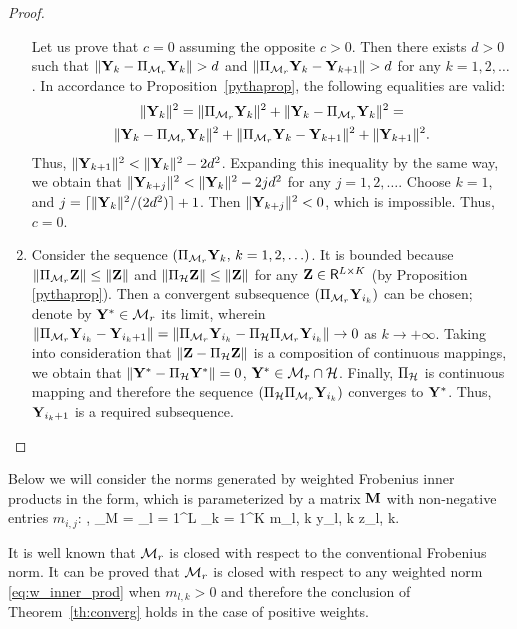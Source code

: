 \documentclass[sii]{ipart}
\begin{document}
\begin{proof}
\begin{enumerate}
		Let us prove that $c = 0$ assuming the opposite $c > 0$. Then there exists $d > 0$ such that $\|\mathbf{Y}_k - \Pi_{\mathcal{M}_r} \mathbf{Y}_k\| > d$ and $\|\Pi_{\mathcal{M}_r} \mathbf{Y}_k - \mathbf{Y}_{k + 1}\| > d$ for any $k = 1, 2, \ldots$. In accordance to Proposition~\ref{pythaprop}, the following equalities are valid:
		\begin{multline*}
		\|\bfY_k\|^2 = \|\Pi_{\calM_r} \bfY_k\|^2 + \|\bfY_k - \Pi_{\calM_r} \bfY_k\|^2 =\\ \|\bfY_k - \Pi_{\calM_r} \bfY_k\|^2 + \|\Pi_{\calM_r} \bfY_k - \bfY_{k + 1}\|^2 + \|\bfY_{k + 1}\|^2.
		\end{multline*}
		Thus, $\|\mathbf{Y}_{k+1}\|^2 < \|\mathbf{Y}_k\|^2 - 2d^2$. Expanding this inequality by the same way, we obtain that $\|\mathbf{Y}_{k+j}\|^2 < \|\mathbf{Y}_k\|^2 - 2 j d^2$ for any $j = 1, 2, \ldots$. Choose $k = 1$, and $j = \lceil \|\mathbf{Y}_k\|^2 / (2d^2) \rceil + 1$. Then $\|\mathbf{Y}_{k+j}\|^2 < 0$, which is impossible. Thus, $c=0$.
		\item Consider the sequence $(\Pi_{\mathcal{M}_r} \mathbf{Y}_k,\, k = 1, 2, \ldots)$. It is bounded because $\|\Pi_{\mathcal{M}_r} \mathbf{Z}\| \le \|\mathbf{Z}\|$ and $\|\Pi_{\mathcal{H}} \mathbf{Z}\| \le \|\mathbf{Z}\|$ for any $\mathbf{Z} \in \mathsf{R}^{L \times K}$ (by Proposition \ref{pythaprop}). Then a convergent subsequence $(\Pi_{\mathcal{M}_r} \mathbf{Y}_{i_k})$ can be chosen; denote by $\mathbf{Y}^*\in\mathcal{M}_r$ its limit, wherein $\|\Pi_{\mathcal{M}_r} \mathbf{Y}_{i_k} - \mathbf{Y}_{i_k + 1}\| = \|\Pi_{\mathcal{M}_r} \mathbf{Y}_{i_k} - \Pi_{\mathcal{H}} \Pi_{\mathcal{M}_r} \mathbf{Y}_{i_k}\| \to 0$ as $k \to + \infty$. Taking into consideration that $\|\mathbf{Z} - \Pi_{\mathcal{H}} \mathbf{Z}\|$ is a composition of continuous mappings, we obtain that $\|\mathbf{Y}^* - \Pi_{\mathcal{H}} \mathbf{Y}^*\| = 0$, $\mathbf{Y}^* \in \mathcal{M}_r \cap \mathcal{H}$. Finally, $\Pi_{\mathcal{H}}$ is continuous mapping and therefore the sequence $(\Pi_{\mathcal{H}} \Pi_{\mathcal{M}_r} \mathbf{Y}_{i_k})$ converges to $\mathbf{Y}^*$. Thus, $\mathbf{Y}_{i_k + 1}$ is a required subsequence.
	\end{enumerate}
\end{proof}

Below we will consider the norms generated by weighted Frobenius inner products in the form, which is parameterized by a matrix $\mathbf{M}$ with non-negative entries $m_{i,j}$: 
\be
\label{eq:w_inner_prod}
\langle\bfY, \bfZ\rangle_M = \sum_{l = 1}^L \sum_{k = 1}^K m_{l, k} y_{l, k} z_{l, k}.
\ee

It is well known that $\mathcal{M}_r$ is closed with respect to the conventional Frobenius norm. It can be proved that $\mathcal{M}_r$ is closed with respect to any weighted norm \eqref{eq:w_inner_prod} when $m_{l,k} > 0$ and therefore the conclusion of Theorem~\ref{th:converg} holds in the case of positive weights.
\end{document}
